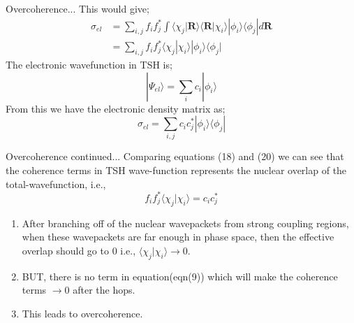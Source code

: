 \documentclass{beamer}
\begin{document}
	\begin{frame}[t]{Overcoherence...}
	This would give;
	\begin{equation}
	\begin{split}
	\sigma_{el} &= \sum_{i,j} f_if_j^* \displaystyle\int \langle\chi_j|\textbf{R}\rangle\langle\textbf{R}|\chi_i\rangle|\phi_i\rangle\langle\phi_j| d\textbf{R}\\
	&= \sum_{i,j} f_if_j^* \langle\chi_j|\chi_i\rangle|\phi_i\rangle\langle\phi_j|
	\end{split}
	\end{equation}
	The electronic wavefunction in TSH is;
	\begin{equation}
	|\Psi_{el}\rangle = \sum_i c_i|\phi_i\rangle
	\end{equation}
	From this we have the electronic density matrix as;
	\begin{equation}
	\sigma_{el} = \sum_{i,j} c_ic_j^*|\phi_i\rangle\langle\phi_j|
	\end{equation}
    \end{frame}	
    
    \begin{frame}[t]{Overcoherence continued...}
    Comparing equations (18) and (20) we can see that the coherence terms in TSH wave-function  represents the nuclear overlap of the total-wavefunction, i.e.,
    \begin{equation}
    f_if_j^*\langle\chi_j|\chi_i\rangle = c_ic_j^*
    \end{equation} 
    \begin{enumerate}
    \item{After branching off of the nuclear wavepackets from strong coupling regions, when these wavepackets are far enough in phase space, then the effective overlap should go to 0 i.e., $\langle\chi_j|\chi_i\rangle \rightarrow 0$.}
    \item{BUT, there is no term in equation(eqn(9)) which will make the coherence terms $\rightarrow 0$ after the hops.}
    \item{This leads to overcoherence.}
	\end{enumerate}        
    \end{frame}
    
\end{document}

